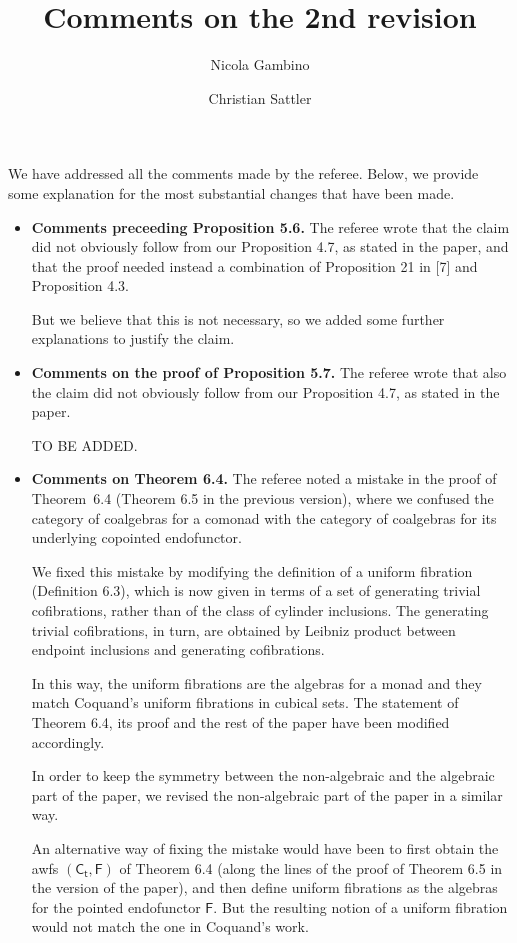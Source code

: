 \documentclass[reqno,10pt,a4paper,oneside,draft]{amsart}
\begin{document}
\title{Comments on the 2nd revision} 

\author{Nicola Gambino \and Christian Sattler} 

\maketitle

We have addressed all the comments made by the referee. Below, we provide some explanation for the most substantial changes that have been made. 

\begin{itemize}
\item {\bf Comments preceeding Proposition 5.6.} The referee wrote that the claim did not obviously follow from our Proposition 4.7, as stated in the paper, and that the proof
needed instead a combination of 
Proposition 21 in [7] and Proposition 4.3. 

But we believe that this is not necessary, so we added some further explanations to justify the claim.
\item {\bf Comments on the proof of Proposition 5.7.} The referee wrote that also the claim did not obviously follow from our Proposition 4.7, as stated in the paper. 

TO BE ADDED.

\item {\bf Comments on Theorem 6.4.} The referee noted a mistake in the proof of Theorem~6.4 (Theorem 6.5 in the previous version), where we 
confused the category of coalgebras for a comonad with the category of coalgebras for its underlying copointed endofunctor. 

We fixed this mistake by modifying the definition of a uniform fibration (Definition 6.3), which is now given in terms of a set of generating trivial cofibrations, rather than of
the class of cylinder inclusions. The generating trivial cofibrations, in turn, are obtained by Leibniz product between endpoint inclusions and generating cofibrations. 

In this way, the uniform fibrations are the algebras for a monad and they match Coquand's uniform fibrations in cubical sets. The statement
of Theorem 6.4, its proof and the rest of the paper have been modified accordingly. 

In order to keep the symmetry between the non-algebraic and the algebraic part of the paper,
we  revised  the non-algebraic part of the paper in a similar way. 

An alternative way of fixing the mistake would have been to first obtain the awfs $(\mathsf{C_t}, \mathsf{F})$ of Theorem 6.4 (along the lines of the proof of Theorem 6.5 in the version of the paper), and then define uniform fibrations as the algebras for the pointed endofunctor $\mathsf{F}$.
But the resulting notion of a uniform fibration would not match the one in Coquand's work.



\end{itemize}
\end{document}
